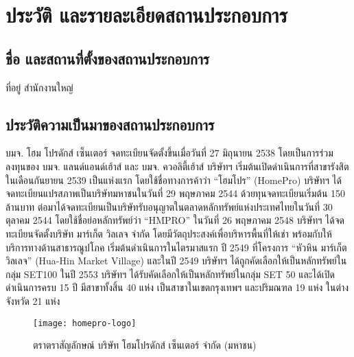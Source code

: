 \section{ประวัติ และรายละเอียดสถานประกอบการ}
    \subsection{ชื่อ และสถานที่ตั้งของสถานประกอบการ}
        {\Company}

        ที่อยู่ {\Company} สำนักงานใหญ่

        {\Address}
    \subsection{ประวัติความเป็นมาของสถานประกอบการ}
        บมจ. โฮม โปรดักส์ เซ็นเตอร์ จดทะเบียนจัดตั้งขึ้นเมื่อวันที่ 27 มิถุนายน 2538 โดยเป็นการร่วมลงทุนของ บมจ. แลนด์แอนด์เฮ้าส์ และ บมจ. ควอลิตี้เฮ้าส์ บริษัทฯ เริ่มต้นเปิดดำเนินการที่สาขารังสิตในเดือนกันยายน 2539 เป็นแห่งแรก โดยใช้ชื่อทางการค้าว่า “โฮมโปร” (HomePro)
        บริษัทฯ ได้จดทะเบียนแปรสภาพเป็นบริษัทมหาชนในวันที่ 29 พฤษภาคม 2544 ด้วยทุนจดทะเบียนเริ่มต้น 150 ล้านบาท ต่อมาได้จดทะเบียนเป็นบริษัทรับอนุญาตในตลาดหลักทรัพย์แห่งประเทศไทยในวันที่ 30 ตุลาคม 2544 โดยใช้ชื่อย่อหลักทรัพย์ว่า “HMPRO”
        ในวันที่ 26 พฤษภาคม 2548 บริษัทฯ ได้จดทะเบียนจัดตั้งบริษัท มาร์เก็ต วิลเลจ จำกัด โดยมีวัตถุประสงค์เพื่อบริหารพื้นที่ให้เช่า พร้อมกับให้บริการทางด้านสาธารณูปโภค เริ่มต้นดำเนินการในไตรมาสแรก ปี 2549 ที่โครงการ “หัวหิน มาร์เก็ต วิลเลจ” (Hua-Hin Market Village)
        และในปี 2549 บริษัทฯ ได้ถูกคัดเลือกให้เป็นหลักทรัพย์ในกลุ่ม SET100
        ในปี 2553 บริษัทฯ ได้รับคัดเลือกให้เป็นหลักทรัพย์ในกลุ่ม SET 50  และได้เปิดดำเนินการครบ 15 ปี มีสาขาทั้งสิ้น 40 แห่ง เป็นสาขาในเขตกรุงเทพฯ และปริมณฑล 19 แห่ง ในต่างจังหวัด 21 แห่ง
        \begin{figure}[H]
            \centering
            \texttt{[image: homepro-logo]}
            \caption{ตราตราสัญลักษณ์ บริษัท โฮมโปรดักส์ เซ็นเตอร์ จำกัด (มหาชน)}\label{homepro-logo}
        \end{figure}

